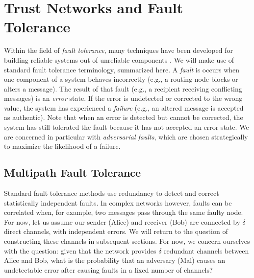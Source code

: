 \documentclass[10pt,letterpaper]{article}
\begin{document}
\section*{Trust Networks and Fault Tolerance}
\label{sec-ft}

Within the field of {\em fault tolerance},
many techniques have been developed for building reliable systems
out of unreliable components
\cite{avizienis_basic_2004, von_neumann_probabilistic_1956}.
We will make use of standard fault tolerance terminology, summarized here.
A {\em fault} is occurs when one component
of a system behaves incorrectly (e.g., a routing node blocks or
alters a message).
The result of that fault (e.g., a recipient receiving conflicting messages)
is an {\em error} state.
If the error is undetected or corrected to the wrong value,
the system has experienced a {\em failure} (e.g., an altered message is
accepted as authentic).
Note that when an error is detected but cannot be corrected,
the system has still tolerated the fault because it has not accepted an error
state.
We are concerned in particular with {\em adversarial faults},
which are chosen strategically to maximize the likelihood of a failure.

\subsection*{Multipath Fault Tolerance}

Standard fault tolerance methods use redundancy to detect and correct
statistically independent faults.
In complex networks however, faults can be correlated when,
for example, two messages pass through the same faulty node.
For now, let us assume our sender (Alice) and receiver (Bob) are connected
by $\delta$ direct channels, with independent errors.
We will return to the question of constructing these channels in subsequent
sections.
For now, we concern ourselves with the question:
given that the network provides $\delta$ redundant channels between
Alice and Bob,
what is the probability that an adversary (Mal) causes an undetectable
error after causing faults in a fixed number of channels?
\end{document}

